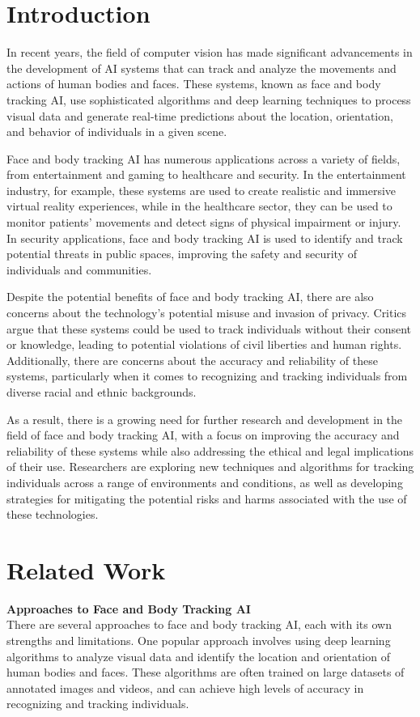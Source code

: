 \section{Introduction}
In recent years, the field of computer vision has made significant advancements in the development of AI 
systems that can track and analyze the movements and actions of human bodies and faces. These systems, known as face and body tracking AI, 
use sophisticated algorithms and deep learning techniques to process visual data and generate real-time predictions about the location, 
orientation, and behavior of individuals in a given scene.

Face and body tracking AI has numerous applications across a variety of fields, from entertainment and gaming to healthcare and 
security. In the entertainment industry, for example, these systems are used to create realistic and immersive virtual reality experiences, 
while in the healthcare sector, they can be used to monitor patients' movements and detect signs of physical impairment or injury. 
In security applications, face and body tracking AI is used to identify and track potential threats in public spaces, improving 
the safety and security of individuals and communities.

Despite the potential benefits of face and body tracking AI, there are also concerns about the technology's potential 
misuse and invasion of privacy. Critics argue that these systems could be used to track individuals without their 
consent or knowledge, leading to potential violations of civil liberties and human rights. Additionally, 
there are concerns about the accuracy and reliability of these systems, particularly when it comes to recognizing and tracking 
individuals from diverse racial and ethnic backgrounds.

As a result, there is a growing need for further research and development in the field of face and body tracking AI, 
with a focus on improving the accuracy and reliability of these systems while also addressing the ethical and legal 
implications of their use. Researchers are exploring new techniques and algorithms for tracking individuals across a 
range of environments and conditions, as well as developing strategies for mitigating the potential risks and harms 
associated with the use of these technologies.

\section{Related Work}
\textbf{Approaches to Face and Body Tracking AI} \\
There are several approaches to face and body tracking AI, each with its own strengths and limitations. One popular approach involves 
using deep learning algorithms to analyze visual data and identify the location and orientation of human bodies and faces. 
These algorithms are often trained on large datasets of annotated images and videos, and can achieve high levels of accuracy 
in recognizing and tracking individuals.

